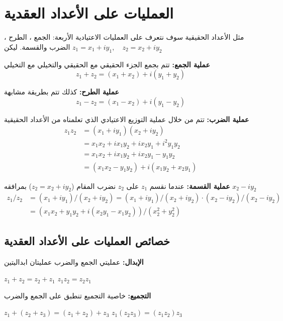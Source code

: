 \section{العمليات على الأعداد العقدية}
مثل الأعداد الحقيقية سوف نتعرف على العمليات الاعتيادية الأربعة: الجمع ، الطرح ، الضرب والقسمة.\linebreak
ليكن \(z_1 = x_1 + iy_1 , \quad z_2 = x_2 + iy_2\)
\begin{tasks}[cols=1, label=\textbf{\arabic*.}, labelsep=5pt]
	\task \textbf{عملية الجمع:} تتم بجمع الجزء الحقيقي مع الحقيقي والتخيلي مع التخيلي
	\[
	z_1 + z_2 = (x_1 + x_2) + i(y_1 + y_2)
	\]
	
	\task \textbf{عملية الطرح:} كذلك تتم بطريقة مشابهة
	\[
	z_1 - z_2 = (x_1 - x_2) + i(y_1 - y_2)
	\]
	
	\task \textbf{عملية الضرب:} تتم من خلال عملية التوزيع الاعتيادي الذي تعلمناه من الأعداد الحقيقية 
	\begin{align*}
		z_1 z_2 &= (x_1 + iy_1) (x_2 + iy_2)\\
		&= x_1x_2 + ix_1 y_2 + i x_2 y_1 + i^2 y_1 y_2\\
		&= x_1x_2 + ix_1 y_2 + i x_2 y_1 - y_1 y_2\\
		&= (x_1x_2 - y_1y_2) + i (x_1y_2 + x_2 y_1)
	\end{align*}
	
	\task \textbf{عملية القسمة:} عندما نقسم \(z_1\) على \(z_2\) نضرب المقام (\(z_2 = x_2 + i y_2\)) بمرافقه \(x_2 - i y_2\)
	\begin{align*}
		z_1/z_2 &= (x_1 + iy_1)/(x_2 + i y_2) = (x_1 + iy_1)/(x_2 + i y_2) \cdot (x_2 - i y_2)/(x_2 - i y_2)\\
		&= (x_1x_2 + y_1y_2 + i (x_2y_1 - x_1y_2))/(x_2^2 + y_2^2) 
	\end{align*} 
\end{tasks}

\subsection*{خصائص العمليات على الأعداد العقدية}
\begin{tasks}[cols=1, label=\textbf{\arabic*.}, labelsep=5pt]
	\task \textbf{الإبدال:} عمليتي الجمع والضرب عمليتان ابداليتين
	\begin{tasks}[cols=2]
		\task \(z_1 + z_2 = z_2 + z_1\)
		\task \(z_1z_2 = z_2z_1\)
	\end{tasks}
	
	\task \textbf{التجميع:} خاصية التجميع تنطبق على الجمع والضرب
	\begin{tasks}[cols=2]
		\task \(z_1 + (z_2 + z_3) = (z_1 + z_2) + z_3\)
		\task \(z_1(z_2 z_3) = (z_1 z_2) z_3\)
	\end{tasks}
\end{tasks}

